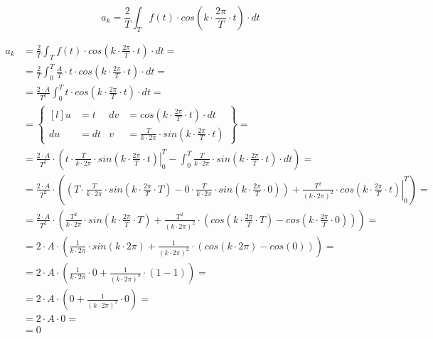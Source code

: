 \begin{task}



\begin{equation}
a_k=\frac{2}{T}\int_{T}f(t) \cdot cos\left( k \cdot \frac{2\pi}{T} \cdot t\right) \cdot dt
\end{equation}


\begin{align*}
a_k&=\frac{2}{T}\int_{T}f(t) \cdot cos\left( k \cdot \frac{2\pi}{T} \cdot t\right) \cdot dt=\\
&=\frac{2}{T}\int_{0}^{T} \frac{A}{T} \cdot t \cdot cos\left( k \cdot \frac{2\pi}{T} \cdot t\right) \cdot dt=\\
&=\frac{2\cdot A}{T^2}\int_{0}^{T} t \cdot cos\left( k \cdot \frac{2\pi}{T} \cdot t\right) \cdot dt=\\
&=\begin{Bmatrix*}[l]
u&=t & dv&=cos\left( k \cdot \frac{2\pi}{T} \cdot t\right) \cdot dt \\
du&=dt & v&=\frac{T}{k\cdot 2\pi}\cdot sin\left( k \cdot \frac{2\pi}{T} \cdot t\right)
\end{Bmatrix*}=\\
&=\frac{2\cdot A}{T^2}\cdot \left( \left. t \cdot \frac{T}{k\cdot 2\pi}\cdot sin\left( k \cdot \frac{2\pi}{T} \cdot t\right) \right|_{0}^{T} - \int_{0}^{T}  \frac{T}{k\cdot 2\pi}\cdot sin\left( k \cdot \frac{2\pi}{T} \cdot t\right) \cdot dt \right)=\\
&=\frac{2\cdot A}{T^2}\cdot \left( \left( T \cdot \frac{T}{k\cdot 2\pi}\cdot sin\left( k \cdot \frac{2\pi}{T} \cdot T\right) - 0 \cdot \frac{T}{k\cdot 2\pi}\cdot sin\left( k \cdot \frac{2\pi}{T} \cdot 0\right) \right) + \left.  \frac{T^2}{\left(k\cdot 2\pi\right)^2}\cdot cos\left( k \cdot \frac{2\pi}{T} \cdot t\right) \right|_{0}^{T} \right)=\\
&=\frac{2\cdot A}{T^2}\cdot \left(\frac{T^2}{k\cdot 2\pi}\cdot sin\left( k \cdot \frac{2\pi}{T} \cdot T\right) + \frac{T^2}{\left(k\cdot 2\pi\right)^2}\cdot \left( cos\left( k \cdot \frac{2\pi}{T} \cdot T\right) - cos\left( k \cdot \frac{2\pi}{T} \cdot 0\right) \right) \right)=\\
&=2\cdot A\cdot \left(\frac{1}{k\cdot 2\pi}\cdot sin\left( k \cdot 2\pi\right) + \frac{1}{\left(k\cdot 2\pi\right)^2}\cdot \left( cos\left( k \cdot 2\pi\right) - cos\left( 0\right) \right) \right)=\\
&=2\cdot A\cdot \left(\frac{1}{k\cdot 2\pi}\cdot 0 + \frac{1}{\left(k\cdot 2\pi\right)^2}\cdot \left( 1 - 1 \right) \right)=\\
&=2\cdot A\cdot \left(0 + \frac{1}{\left(k\cdot 2\pi\right)^2}\cdot 0 \right)=\\
&=2\cdot A\cdot 0=\\
&=0
\end{align*}


\end{task}
